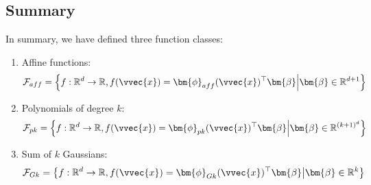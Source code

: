 \documentclass[letterpaper,10pt,english]{jupyterBook}
\begin{document}
\subsection{Summary}
\label{\detokenize{regression_functions:summary}}
\sphinxAtStartPar
In summary, we have defined three function classes:
\begin{enumerate}
%
\item {} 
\sphinxAtStartPar
Affine functions:
\begin{equation*}
\begin{split}\mathcal{F}_{aff}=\left\{f:\mathbb{R}^d\rightarrow \mathbb{R}, f(\vvec{x})= \bm{\phi}_{aff}(\vvec{x})^\top\bm{\beta}\middle\vert \bm{\beta}\in\mathbb{R}^{d+1}\right\}
\end{split}
\end{equation*}

\item {} 
\sphinxAtStartPar
Polynomials of degree \(k\):
\begin{equation*}
\begin{split}\mathcal{F}_{pk}=\left\{f:\mathbb{R}^d\rightarrow \mathbb{R},f(\vvec{x})=\bm{\phi}_{pk}(\vvec{x})^\top \bm{\beta} \middle\vert 
\bm{\beta}\in\mathbb{R}^{(k+1)^d} 
\right\}
\end{split}
\end{equation*}

\item {} 
\sphinxAtStartPar
Sum of \(k\) Gaussians:
\begin{equation*}
\begin{split}
\mathcal{F}_{Gk}=\left\{f:\mathbb{R}^d\rightarrow\mathbb{R},f(\vvec{x})=\bm{\phi}_{Gk}(\vvec{x})^\top\bm{\beta}\middle\vert \bm{\beta}\in\mathbb{R}^k\right\}
\end{split}
\end{equation*}

\end{enumerate}

\sphinxstepscope
\end{document}

